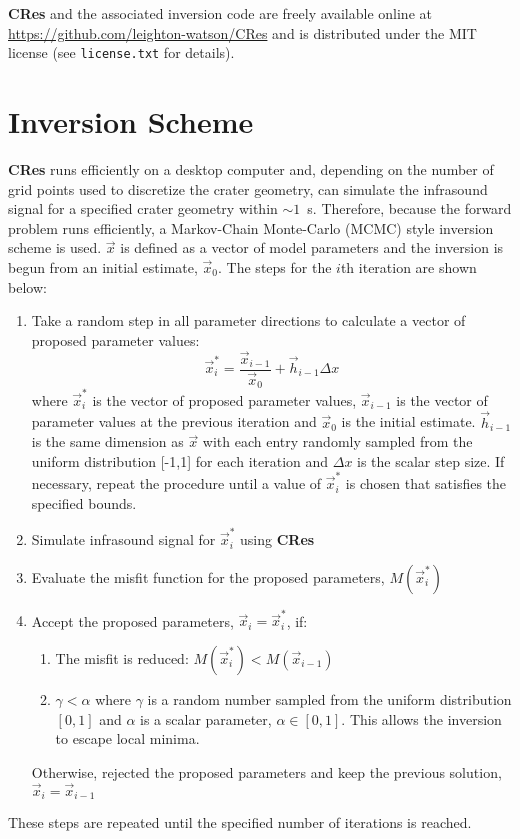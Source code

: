 \documentclass[10pt]{article}
\begin{document}
{\bf CRes} and the associated inversion code are freely available online at \href{https://github.com/leighton-watson/CRes}{https://github.com/leighton-watson/CRes} and is distributed under the MIT license (see \texttt{license.txt} for details). 

\section{Inversion Scheme}
{\bf CRes} runs efficiently on a desktop computer and,  depending on the number of grid points used to discretize the crater geometry, can simulate the infrasound signal for a specified crater geometry within $\sim1$~s. Therefore, because the forward problem runs efficiently, a Markov-Chain Monte-Carlo (MCMC) style inversion scheme is used. $\vec{x}$ is defined as a vector of model parameters and the inversion is begun from an initial estimate, $\vec{x}_0$. The steps for the $i$th iteration are shown below:
\begin{enumerate}
    \item Take a random step in all parameter directions to calculate a vector of proposed parameter values:
    \begin{equation}
        \vec{x}_{i}^* = \frac{\vec{x}_{i-1}}{\vec{x}_0} + \vec{h}_{i-1} \Delta x
        \label{eq:inversion step}
    \end{equation}
    where $\vec{x}_{i}^*$ is the vector of proposed parameter values, $\vec{x}_{i-1}$ is the vector of parameter values at the previous iteration and $\vec{x}_0$ is the initial estimate. $\vec{h}_{i-1}$ is the same dimension as $\vec{x}$ with each entry randomly sampled from the uniform distribution [-1,1] for each iteration and $\Delta x$ is the scalar step size. If necessary, repeat the procedure until a value of $\vec{x}_{i}^*$ is chosen that satisfies the specified bounds. 
    \item Simulate infrasound signal for $\vec{x}_{i}^*$ using {\bf CRes}
    \item Evaluate the misfit function for the proposed parameters, $M(\vec{x}_{i}^*)$
    \item Accept the proposed parameters, $\vec{x}_{i} = \vec{x}_{i}^*$, if:
    \begin{enumerate}
        \item The misfit is reduced: $M(\vec{x}_{i}^*) < M(\vec{x}_{i-1})$
        \item $\gamma < \alpha$ where $\gamma$ is a random number sampled from the uniform distribution $[0,1]$ and $\alpha$ is a scalar parameter, $\alpha \in [0, 1]$. This allows the inversion to escape local minima.
    \end{enumerate}
    Otherwise, rejected the proposed parameters and keep the previous solution, $\vec{x}_{i} = \vec{x}_{i-1}$
\end{enumerate}
These steps are repeated until the specified number of iterations is reached.
\end{document}
